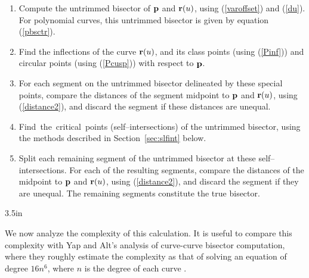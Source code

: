 \begin{enumerate}
\item
        Compute the untrimmed bisector of ${\bf p}$ and ${\bf r}(u)$,
        using (\ref{varoffset}) and (\ref{du}). For polynomial 
        curves, this untrimmed bisector is given by equation (\ref{pbsctr}).
\item
        Find the inflections of the curve ${\bf r}(u)$, and its class
        points (using (\ref{Pinf}))
	and circular points (using (\ref{Pcusp})) 
	with respect to ${\bf p}$.
\item
        For each segment on the untrimmed bisector delineated by these
        special points, compare the distances of the segment midpoint
        to ${\bf p}$ and ${\bf r}(u)$, using (\ref{distance2}), and
        discard the segment if these distances are unequal.
\item
        Find~the~critical~points (self--intersections) of the untrimmed
        bisector, using the methods described in Section~\ref{sec:slfint}
        below.
\item
        Split each remaining segment of the untrimmed bisector at these
        self--intersections. For each of the resulting segments, compare
        the distances of the midpoint to ${\bf p}$ and ${\bf r}(u)$,
        using (\ref{distance2}), and discard the segment if they are
        unequal. The remaining segments constitute the true bisector.
\end{enumerate}

{3.5in}

We now analyze the complexity of this calculation.
It is useful to compare this complexity with Yap and Alt's analysis of 
curve-curve bisector computation, where they roughly estimate
the complexity as that of solving an equation of degree $16n^6$, 
where $n$ is the degree of each curve \cite{yap89}.

